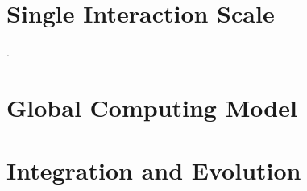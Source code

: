 \documentclass{dune} %
\begin{document}
\part{Single Interaction  Scale}\label{part:event} %


. %
\cleardoublepage


\cleardoublepage

\cleardoublepage

\cleardoublepage

\part{Global Computing Model  }\label{part:model} %

\cleardoublepage


\cleardoublepage


\cleardoublepage

\cleardoublepage



\cleardoublepage


\cleardoublepage


\cleardoublepage


%


%

%

%


\part{Integration and Evolution}
\end{document}
